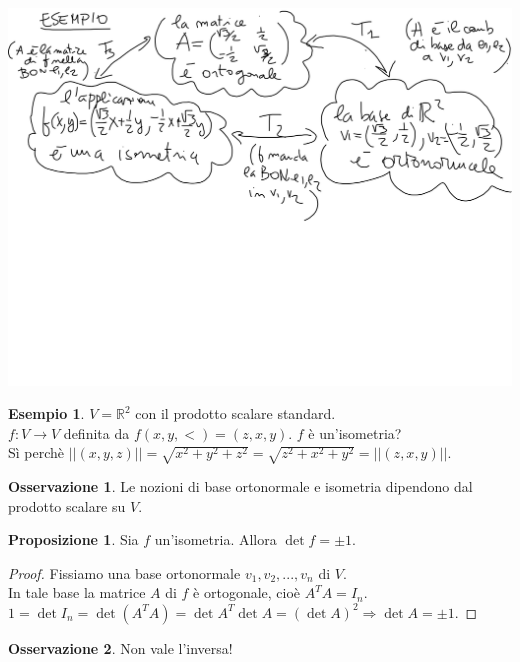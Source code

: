 \documentclass[a4paper]{article}
\theoremstyle{definition}
\newtheorem*{oss}{Osservazione}
\newtheorem*{es}{Esempio}
\newtheorem*{prop}{Proposizione}
\begin{document}
	\begin{center}
		\includegraphics[width=\linewidth]{images/es_teo_ortonormale.png}
	\end{center}
	\begin{es}
		$V = \mathbb{R}^2$ con il prodotto scalare standard. \\
		$f: V \to V$ definita da $f(x, y, <) = (z, x, y)$. $f$ è un'isometria? \\
		Sì perchè $||(x, y, z)|| = \sqrt{x^2 + y^2 + z^2} = \sqrt{z^2 + x^2 + y^2} = ||(z, x, y)||$.
	\end{es}

	\begin{oss}
		Le nozioni di base ortonormale e isometria dipendono dal prodotto scalare su $V$.
	\end{oss}

	\begin{prop}
		Sia $f$ un'isometria. Allora $\det f = \pm 1$.
	\end{prop}

	\begin{proof}
		Fissiamo una base ortonormale $v_1, v_2, ..., v_n$ di $V$. \\
		In tale base la matrice $A$ di $f$ è ortogonale, cioè $A^TA = I_n$. \\
		$1 = \det I_n = \det(A^TA) = \det A^T \det A = (\det A)^2 \Rightarrow \det A = \pm 1$.
	\end{proof}

	\begin{oss}
		Non vale l'inversa!
	\end{oss}
\end{document}
